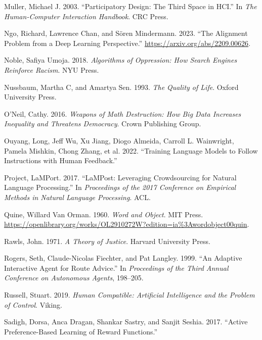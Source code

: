 \documentclass[
  letterpaper,
  numbers=noenddot,
  DIV=11,
  oneside]{scrreprt}
\newlength{\cslhangindent}
\newenvironment{CSLReferences}[2] %
 {\begin{list}{}{%
  \setlength{\itemindent}{0pt}
  \setlength{\leftmargin}{0pt}
  \setlength{\parsep}{0pt}
  \ifodd #1
   \setlength{\leftmargin}{\cslhangindent}
   \setlength{\itemindent}{-1\cslhangindent}
  \fi
  \setlength{\itemsep}{#2\baselineskip}}}
 {\end{list}}
\theoremstyle{remark}
\begin{document}
\begin{CSLReferences}{1}{0}
Muller, Michael J. 2003. {``Participatory Design: The Third Space in
HCI.''} In \emph{The Human-Computer Interaction Handbook}. CRC Press.

Ngo, Richard, Lawrence Chan, and Sören Mindermann. 2023. {``The
Alignment Problem from a Deep Learning Perspective.''}
\url{https://arxiv.org/abs/2209.00626}.

Noble, Safiya Umoja. 2018. \emph{Algorithms of Oppression: How Search
Engines Reinforce Racism}. NYU Press.

Nussbaum, Martha C, and Amartya Sen. 1993. \emph{The Quality of Life}.
Oxford University Press.

O'Neil, Cathy. 2016. \emph{Weapons of Math Destruction: How Big Data
Increases Inequality and Threatens Democracy}. Crown Publishing Group.

Ouyang, Long, Jeff Wu, Xu Jiang, Diogo Almeida, Carroll L. Wainwright,
Pamela Mishkin, Chong Zhang, et al. 2022. {``Training Language Models to
Follow Instructions with Human Feedback.''}

Project, LaMPort. 2017. {``LaMPost: Leveraging Crowdsourcing for Natural
Language Processing.''} In \emph{Proceedings of the 2017 Conference on
Empirical Methods in Natural Language Processing}. ACL.

Quine, Willard Van Orman. 1960. \emph{Word and Object}. MIT Press.
\url{https://openlibrary.org/works/OL2910272W?edition=ia\%3Awordobject00quin}.

Rawls, John. 1971. \emph{A Theory of Justice}. Harvard University Press.

Rogers, Seth, Claude-Nicolas Fiechter, and Pat Langley. 1999. {``An
Adaptive Interactive Agent for Route Advice.''} In \emph{Proceedings of
the Third Annual Conference on Autonomous Agents}, 198--205.

Russell, Stuart. 2019. \emph{Human Compatible: Artificial Intelligence
and the Problem of Control}. Viking.

Sadigh, Dorsa, Anca Dragan, Shankar Sastry, and Sanjit Seshia. 2017.
{``Active Preference-Based Learning of Reward Functions.''}


\end{CSLReferences}
\end{document}

